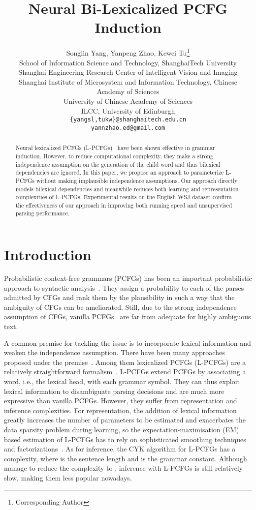 \documentclass[11pt,a4paper]{article}
\title{Neural Bi-Lexicalized PCFG Induction}
\author{Songlin Yang, Yanpeng Zhao, Kewei Tu\thanks{\; Corresponding Author}\\
  School of Information Science and Technology, ShanghaiTech University \\
  \textsuperscript{}{Shanghai Engineering Research Center of Intelligent Vision and Imaging}\\
  \textsuperscript{}{Shanghai Institute of Microsystem and Information Technology, Chinese Academy of Sciences}\\
    \textsuperscript{}{University of Chinese Academy of Sciences}\\
 {ILCC, University of Edinburgh}\\
    {\tt \{yangsl,tukw\}@shanghaitech.edu.cn}\\
    {\tt yannzhao.ed@gmail.com}
 }
\date{}
\begin{document}
\maketitle
\begin{abstract}
Neural lexicalized PCFGs (L-PCFGs)~\citep{zhu-etal-2020-return} have been shown effective in grammar induction. However, to reduce computational complexity, they make a strong independence assumption on the generation of the child word and thus bilexical dependencies are ignored.
In this paper, we propose an approach to parameterize L-PCFGs without making implausible independence assumptions. Our approach directly models bilexical dependencies and meanwhile reduces both learning and representation complexities of L-PCFGs.  Experimental results on the English WSJ dataset confirm the effectiveness of our approach in improving both running speed and unsupervised parsing performance.
\end{abstract}

\section{Introduction}

Probabilistic context-free grammars (PCFGs) has been an important probabilistic approach to syntactic analysis~\citep{lari1990estimation,jelinek1992}.
They assign a probability to each of the parses admitted by CFGs and rank them by the plausibility in such a way that the ambiguity of CFGs can be ameliorated.
Still, due to the strong independence assumption of CFGs, 
vanilla PCFGs~\citep{Charniak1996} are far from adequate for highly ambiguous text.

A common premise for tackling the issue is to incorporate lexical information and weaken the independence assumption.
There have been many approaches proposed under the premise~\citep{magerman-1995-statistical,collins-1997-three,johnson-1998-pcfg,klein-manning-2003-accurate}.
Among them lexicalized PCFGs (L-PCFGs) are a relatively straightforward formalism~\citep{collins-2003-head}.
L-PCFGs extend PCFGs by associating a word, i.e., the lexical head, with each grammar symbol.
They can thus exploit lexical information to disambiguate parsing decisions and are much more expressive than vanilla PCFGs. However, they suffer from representation and inference  complexities.
For representation, the addition of lexical information 
greatly increases the number of parameters to be estimated and exacerbates the data sparsity problem during learning,
so the expectation-maximisation (EM) based estimation of L-PCFGs has to rely on sophisticated smoothing techniques and factorizations~\citep{collins-2003-head}. As for inference, the  CYK algorithm for L-PCFGs has a  complexity, where  is the sentence length and  is the grammar constant. Although \citet{eisner-satta-1999-efficient} manage to reduce the complexity to , inference with L-PCFGs is still relatively slow, making them less popular nowadays.
\end{document}
